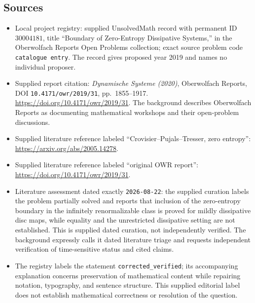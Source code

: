 \documentclass[11pt]{article}
\begin{document}
\subsection{Sources}
\begin{itemize}
\item Local project registry: supplied UnsolvedMath record with permanent ID \(30004181\), title ``Boundary of Zero-Entropy Dissipative Systems,'' in the Oberwolfach Reports Open Problems collection; exact source problem code \texttt{catalogue entry}. The record gives proposed year 2019 and names no individual proposer.
\item Supplied report citation: \emph{Dynamische Systeme (2020)}, Oberwolfach Reports, DOI \texttt{10.4171/owr/2019/31}, pp.\ 1855--1917. \url{https://doi.org/10.4171/owr/2019/31}. The background describes Oberwolfach Reports as documenting mathematical workshops and their open-problem discussions.
\item Supplied literature reference labeled ``Crovisier--Pujals--Tresser, zero entropy'': \url{https://arxiv.org/abs/2005.14278}.
\item Supplied literature reference labeled ``original OWR report'': \url{https://doi.org/10.4171/owr/2019/31}.
\item Literature assessment dated exactly \texttt{2026-08-22}: the supplied curation labels the problem partially solved and reports that inclusion of the zero-entropy boundary in the infinitely renormalizable class is proved for mildly dissipative disc maps, while equality and the unrestricted dissipative setting are not established. This is supplied dated curation, not independently verified. The background expressly calls it dated literature triage and requests independent verification of time-sensitive status and cited claims.
\item The registry labels the statement \texttt{corrected\_verified}; its accompanying explanation concerns preservation of mathematical content while repairing notation, typography, and sentence structure. This supplied editorial label does not establish mathematical correctness or resolution of the question.
\end{itemize}
\end{document}
